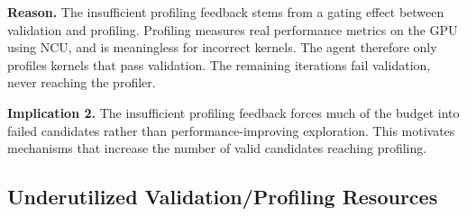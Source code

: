 \begin{table}[t]
    \centering
    \scriptsize
    \setlength{\tabcolsep}{2pt}
    \caption{Best speedups over the \texttt{KernelBench} reference from 100 non-reasoning generations w/o and w/ conditioning on \emph{reasoning prefixes} with two models.
: no available kernels.}
    \label{tab:nonreasoning_speedups_w_wo_shared_prefix_cache}
    \vspace{-10pt}
    {
        \renewcommand{\arraystretch}{0.85}
    }
    \vspace{-15pt}
\end{table}
\noindent\textbf{Reason.} The insufficient profiling feedback stems from a gating effect between validation and profiling. Profiling measures real performance metrics on the GPU using NCU, and is meaningless for incorrect kernels. The agent therefore only profiles kernels that pass validation. The remaining iterations fail validation, never reaching the profiler.


\noindent\textbf{Implication 2.} The insufficient profiling feedback forces much of the budget into failed candidates rather than
performance-improving exploration. This motivates mechanisms that increase the number of valid candidates reaching
profiling.

\subsection{Underutilized Validation/Profiling Resources}\label{subsec:gpu_idle}

